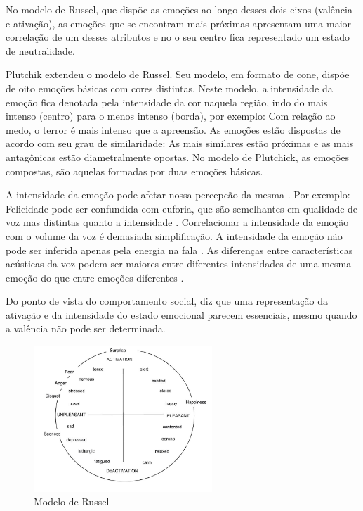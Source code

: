 No modelo de Russel, que dispõe as emoções ao longo desses dois eixos (valência e ativação), as emoções que se encontram mais próximas apresentam uma maior correlação de um desses atributos e no o seu centro fica representado um estado de neutralidade.

Plutchik extendeu \cite{57} o modelo de Russel. Seu modelo, em formato de cone, dispõe de oito emoções básicas com cores distintas. Neste modelo, a intensidade da emoção fica denotada pela intensidade da cor naquela região, indo do mais intenso (centro) para o menos intenso (borda), por exemplo: Com relação ao medo, o terror é mais intenso que a apreensão. As emoções estão dispostas de acordo com seu grau de similaridade: As mais similares estão próximas e as mais antagônicas estão diametralmente opostas. No modelo de Plutchick, as emoções compostas, são aquelas formadas por duas emoções básicas.

A intensidade da emoção pode afetar nossa percepcão da mesma \cite{18.46}. Por exemplo: Felicidade pode ser confundida com euforia, que são semelhantes em qualidade de voz mas distintas quanto a intensidade \cite{18.9}. Correlacionar a intensidade da emoção com o volume da voz é demasiada simplificação. A intensidade da emoção não pode ser inferida apenas pela energia na fala \cite{18.12}. As diferenças entre características acústicas da voz podem ser maiores entre diferentes intensidades de uma mesma emoção do que entre emoções diferentes \cite{18.46}.

Do ponto de vista do comportamento social, \cite{16} diz que uma representação da ativação e da intensidade do estado emocional parecem essenciais, mesmo quando a valência não pode ser determinada.

\begin{figure}[!ht]
\centering
\includegraphics[width=0.6\textwidth]{imagens/russel.JPG}
\caption{\label{fig:russel}Modelo de Russel \cite{25}}
\end{figure}

